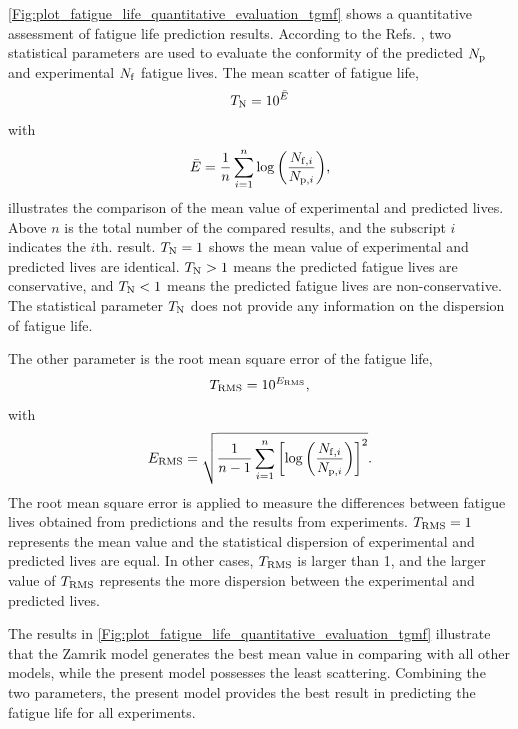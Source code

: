 \documentclass[preprint,5p,twocolumn,11pt,sort&compress]{elsarticle}
\begin{document}
\autoref{Fig:plot_fatigue_life_quantitative_evaluation_tgmf} shows a quantitative assessment of fatigue life prediction results. According to the Refs. \cite{KAROLCZUK201439,WALAT201473,SKIBICKI201718}, two statistical parameters are used to evaluate the conformity of the predicted $N_{\rm p}$ and experimental $N_{\rm f}$ fatigue lives. The mean scatter of fatigue life,
\begin{equation}
{T_{\rm N}} = {10^{\bar E}}
\label{Equ:TN}
\end{equation}
with
\begin{equation}
\bar E = \frac{1}{n}\sum\limits_{i = 1}^n {\log \left( {\frac{{{N_{{\rm f},i}}}}{{{N_{{\rm p},i}}}}} \right)},
\end{equation}
illustrates the comparison of the mean value of experimental and predicted lives. Above $n$ is the total number of the compared results, and the subscript $i$ indicates the $i$th. result. $T_{\rm N} = 1$ shows the mean value of experimental and predicted lives are identical. $T_{\rm N} > 1$ means the predicted fatigue lives are conservative, and $T_{\rm N} < 1$ means the predicted fatigue lives are non-conservative. The statistical parameter $T_{\rm N}$ does not provide any information on the dispersion of fatigue life.

The other parameter is the root mean square error of the fatigue life,
\begin{equation}
{T_{\rm RMS}} = {10^{{E_{\rm RMS}}}},
\label{Equ:TRMS}
\end{equation}
with
\begin{equation}
{E_{\rm RMS}} = \sqrt {\frac{1}{n-1}\sum\limits_{i = 1}^n {\left[{{\log }}\left( {\frac{{{N_{{\rm f},i}}}}{{{N_{{\rm p},i}}}}} \right) \right]^2}}.
\end{equation}
The root mean square error is applied to measure the differences between fatigue lives obtained from predictions and the results from experiments. $T_{\rm RMS} = 1$ represents the mean value and the statistical dispersion of experimental and predicted lives are equal. In other cases, $T_{\rm RMS}$ is larger than 1, and the larger value of $T_{\rm RMS}$ represents the more dispersion between the experimental and predicted lives.

The results in \autoref{Fig:plot_fatigue_life_quantitative_evaluation_tgmf} illustrate that the Zamrik model generates the best mean value in comparing with all other models, while the present model possesses the least scattering. Combining the two parameters, the present model provides the best result in predicting the fatigue life for all experiments.
\end{document}
